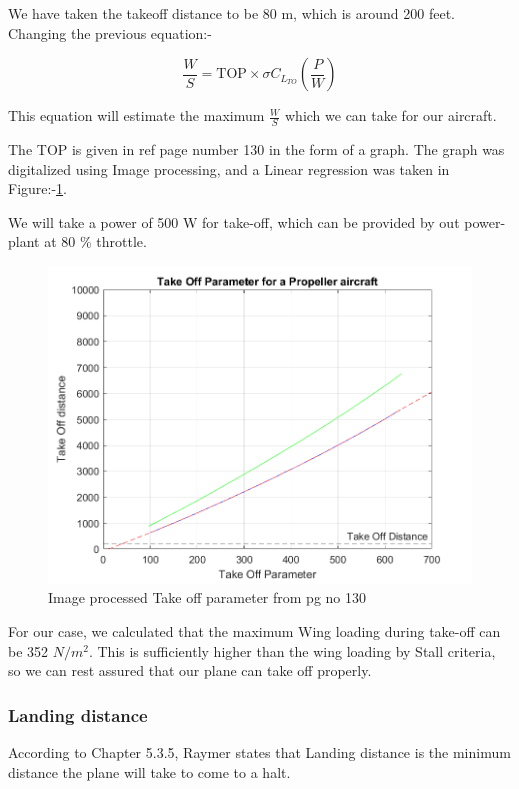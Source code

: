 \documentclass[12 pt]{article}
\begin{document}
We have taken the takeoff distance to be 80 m, which is around 200 feet. Changing the previous equation:-

$$ \frac{W}{S} = \text{TOP} \times \sigma C_{L_{TO}} \left( \frac{P}{W} \right) $$

This equation will estimate the maximum $\frac{W}{S}$ which we can take for our aircraft.

The TOP is given in ref \cite{Raymer.2006} page number 130 in the form of a graph. The graph was digitalized using Image processing, and a Linear regression was taken in Figure:-\ref{Image processed Take off parameter}. 

We will take a power of 500 W for take-off, which can be provided by out power-plant at 80 \% throttle. 

\begin{figure}[h]
    \centering
    \includegraphics[width=0.8\linewidth]{Codes/Week 2/Takeoffparam.png}
    \caption{Image processed Take off parameter from \protect\cite{Raymer.2006} pg no 130}
    \label{Image processed Take off parameter}
\end{figure}


For our case, we calculated that the maximum Wing loading during take-off can be 352 $N/m^2$. This is sufficiently higher than the wing loading by Stall criteria, so we can rest assured that our plane can take off properly.

\subsubsection{Landing distance}

According to \cite{Raymer.2006} Chapter 5.3.5, Raymer states that Landing distance is the minimum distance the plane will take to come to a halt.
\end{document}
